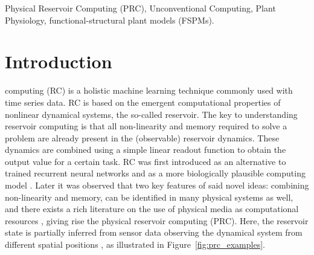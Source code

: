 \documentclass[10pt,a4paper,journal]{IEEEtran}
\begin{document}






\renewcommand\IEEEkeywordsname{Keywords}
\begin{IEEEkeywords}
Physical Reservoir Computing (PRC), Unconventional Computing, Plant Physiology, functional-structural plant models (FSPMs).
\end{IEEEkeywords}


\section{Introduction}

 computing (RC) is a holistic machine learning technique commonly used with time series data.
RC is based on the emergent computational properties of nonlinear dynamical systems, the so-called reservoir.
The key to understanding reservoir computing is that all non-linearity and memory required to solve a problem are already present in the (observable) reservoir dynamics.
These dynamics are combined using a simple linear readout function to obtain the output value for a certain task.
RC was first introduced as an alternative to trained recurrent neural networks and as a more biologically plausible computing model
\cite{jaeger_echo_2002, maass_real-time_2002, steil_backpropagation-decorrelation_2004}. 
Later it was observed that two key features of said novel ideas: combining non-linearity and memory, can be identified in many physical systems as well, and there exists a rich literature on the use of physical media as computational resources \cite{tanaka_recent_2019}, giving rise the physical reservoir computing (PRC). Here, the reservoir state is partially inferred from sensor data observing the dynamical system from different spatial positions \cite{burms_reward-modulated_2015}, as illustrated in \mbox{Figure~\ref{fig:prc_examples}}.
\end{document}
